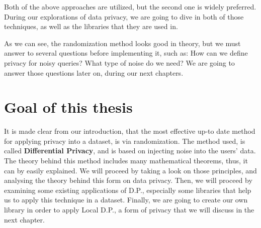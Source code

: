 Both of the above approaches are utilized, but the second one is widely preferred. During our explorations of data privacy, we are going to dive in both of those techniques, as well as the libraries that they are used in.

\par As we can see, the randomization method looks good in theory, but we must answer to several questions before implementing it, such as: How can we define privacy for noisy queries? What type of noise do we need? We are going to answer those questions later on, during our next chapters. 

\section{Goal of this thesis}
It is made clear from our introduction, that the most effective up-to date method for applying privacy into a dataset, is via randomization. The method used, is called \textbf{Differential Privacy}, and is based on injecting noise into the users' data. The theory behind this method includes many mathematical theorems, thus, it can by easily explained. We will proceed by taking a look on those principles, and analysing the theory behind this form on data privacy. Then, we will proceed by examining some existing applications of D.P., especially some libraries that help us to apply this technique in a dataset. Finally, we are going to create our own library in order to apply Local D.P., a form of privacy that we will discuss in the next chapter. 
